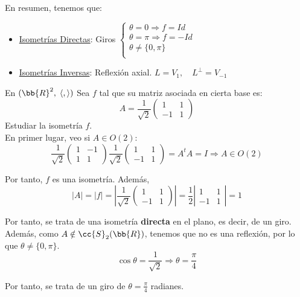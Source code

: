 En resumen, tenemos que:
\begin{itemize}
    \item \underline{Isometrías Directas}:
    Giros $\left\{\begin{array}{l}
        \theta = 0 \Longrightarrow f=Id \\
        \theta = \pi \Longrightarrow f=-Id \\
        \theta \neq\{0,\pi\} \\
    \end{array}\right.$

    \item \underline{Isometrías Inversas}:
    Reflexión axial. $L=V_1,\quad L^\perp=V_{-1}$
\end{itemize}

\begin{ejercicio}
    En $(\bb{R}^2,\;\langle,\rangle)$ Sea $f$ tal que su matriz asociada en cierta base es:
    \begin{equation*}
        A = \frac{1}{\sqrt{2}}\left(\begin{array}{cc}
            1 & 1 \\
            -1 & 1
        \end{array}\right)
    \end{equation*}
    Estudiar la isometría $f$.\\

    En primer lugar, veo si $A\in O(2)$:
    \begin{equation*}
        \frac{1}{\sqrt{2}}\left(\begin{array}{cc}
            1 & -1 \\
            1 & 1
        \end{array}\right)\frac{1}{\sqrt{2}}
        \left(\begin{array}{cc}
            1 & 1 \\
            -1 & 1
        \end{array}\right) = A^tA=I \Longrightarrow A\in O(2)
    \end{equation*}

    Por tanto, $f$ es una isometría. Además, $$|A|=|f|=\left|\frac{1}{\sqrt{2}}\left(\begin{array}{cc}
            1 & 1 \\
            -1 & 1
        \end{array}\right)\right|
        = \frac{1}{2}\left|\begin{array}{cc}
            1 & 1 \\
            -1 & 1
        \end{array}\right|=1$$

    Por tanto, se trata de una isometría \textbf{directa} en el plano, es decir, de un giro. Además, como $A\notin \cc{S}_2(\bb{R})$, tenemos que no es una reflexión, por lo que $\theta\neq \{0,\pi\}$.
    \begin{equation*}
        \cos \theta = \frac{1}{\sqrt{2}} \Longrightarrow \theta = \frac{\pi}{4}
    \end{equation*}

    Por tanto, se trata de un giro de $\theta = \frac{\pi}{4}$ radianes.
\end{ejercicio}

